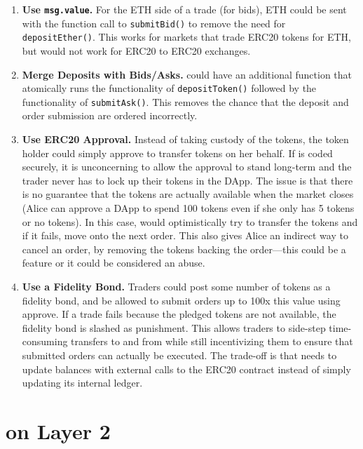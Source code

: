 \begin{enumerate}

\item \textbf{Use \texttt{msg.value}.} For the ETH side of a trade (\ie for bids), ETH could be sent with the function call to \texttt{submitBid()} to remove the need for    \texttt{depositEther()}. This works for markets that trade ERC20 tokens for ETH, but would not work for ERC20 to ERC20 exchanges.

\item \textbf{Merge Deposits with Bids/Asks.} \cm could have an additional function that atomically runs the functionality of \texttt{depositToken()} followed by the functionality of \texttt{submitAsk()}. This removes the chance that the deposit and order submission are ordered incorrectly.

\item \textbf{Use ERC20 Approval.} Instead of \cm taking custody of the tokens, the token holder could simply approve \cm to transfer tokens on her behalf. If \cm is coded securely, it is unconcerning to allow the approval to stand long-term and the trader never has to lock up their tokens in the DApp. The issue is that there is no guarantee that the tokens are actually available when the market closes (\ie Alice can approve a DApp to spend 100 tokens even if she only has 5 tokens or no tokens). In this case, \cm would optimistically try to transfer the tokens and if it fails, move onto the next order. This also gives Alice an indirect way to cancel an order, by removing the tokens backing the order---this could be a feature or it could be considered an abuse.

\item \textbf{Use a Fidelity Bond.} Traders could post some number of tokens as a fidelity bond, and be allowed to submit orders up to 100x this value using approve. If a trade fails because the pledged tokens are not available, the fidelity bond is slashed as punishment. This allows traders to side-step time-consuming transfers to and from \cm while still incentivizing them to ensure that submitted orders can actually be executed. The trade-off  is that \cm needs to update balances with external calls to the ERC20 contract instead of simply updating its internal ledger.

\end{enumerate}

\section{\cm on Layer 2}\label{sec:rollups}

